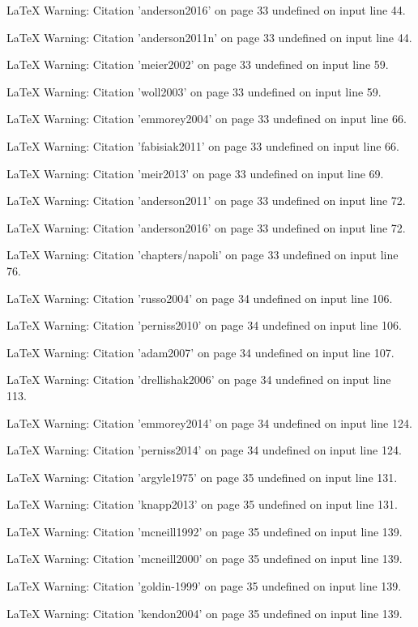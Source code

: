LaTeX Warning: Citation 'anderson2016' on page 33 undefined on input line 44.


LaTeX Warning: Citation 'anderson2011n' on page 33 undefined on input line 44.


LaTeX Warning: Citation 'meier2002' on page 33 undefined on input line 59.


LaTeX Warning: Citation 'woll2003' on page 33 undefined on input line 59.


LaTeX Warning: Citation 'emmorey2004' on page 33 undefined on input line 66.


LaTeX Warning: Citation 'fabisiak2011' on page 33 undefined on input line 66.


LaTeX Warning: Citation 'meir2013' on page 33 undefined on input line 69.


LaTeX Warning: Citation 'anderson2011' on page 33 undefined on input line 72.


LaTeX Warning: Citation 'anderson2016' on page 33 undefined on input line 72.


LaTeX Warning: Citation 'chapters/napoli' on page 33 undefined on input line 76.


LaTeX Warning: Citation 'russo2004' on page 34 undefined on input line 106.


LaTeX Warning: Citation 'perniss2010' on page 34 undefined on input line 106.


LaTeX Warning: Citation 'adam2007' on page 34 undefined on input line 107.


LaTeX Warning: Citation 'drellishak2006' on page 34 undefined on input line 113.


LaTeX Warning: Citation 'emmorey2014' on page 34 undefined on input line 124.


LaTeX Warning: Citation 'perniss2014' on page 34 undefined on input line 124.


LaTeX Warning: Citation 'argyle1975' on page 35 undefined on input line 131.


LaTeX Warning: Citation 'knapp2013' on page 35 undefined on input line 131.


LaTeX Warning: Citation 'mcneill1992' on page 35 undefined on input line 139.


LaTeX Warning: Citation 'mcneill2000' on page 35 undefined on input line 139.


LaTeX Warning: Citation 'goldin-1999' on page 35 undefined on input line 139.


LaTeX Warning: Citation 'kendon2004' on page 35 undefined on input line 139.


